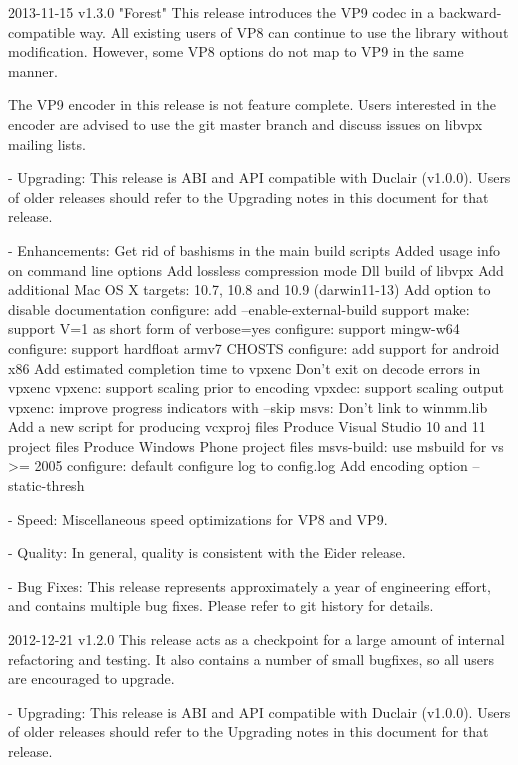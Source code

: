 
\begin{DoxyVerbInclude}
2013-11-15 v1.3.0 "Forest"
  This release introduces the VP9 codec in a backward-compatible way.
  All existing users of VP8 can continue to use the library without
  modification. However, some VP8 options do not map to VP9 in the same manner.

  The VP9 encoder in this release is not feature complete. Users interested in
  the encoder are advised to use the git master branch and discuss issues on
  libvpx mailing lists.

  - Upgrading:
    This release is ABI and API compatible with Duclair (v1.0.0). Users
    of older releases should refer to the Upgrading notes in this document
    for that release.

  - Enhancements:
      Get rid of bashisms in the main build scripts
      Added usage info on command line options
      Add lossless compression mode
      Dll build of libvpx
      Add additional Mac OS X targets: 10.7, 10.8 and 10.9 (darwin11-13)
      Add option to disable documentation
      configure: add --enable-external-build support
      make: support V=1 as short form of verbose=yes
      configure: support mingw-w64
      configure: support hardfloat armv7 CHOSTS
      configure: add support for android x86
      Add estimated completion time to vpxenc
      Don't exit on decode errors in vpxenc
      vpxenc: support scaling prior to encoding
      vpxdec: support scaling output
      vpxenc: improve progress indicators with --skip
      msvs: Don't link to winmm.lib
      Add a new script for producing vcxproj files
      Produce Visual Studio 10 and 11 project files
      Produce Windows Phone project files
      msvs-build: use msbuild for vs >= 2005
      configure: default configure log to config.log
      Add encoding option --static-thresh

  - Speed:
      Miscellaneous speed optimizations for VP8 and VP9.

  - Quality:
      In general, quality is consistent with the Eider release.

  - Bug Fixes:
      This release represents approximately a year of engineering effort,
      and contains multiple bug fixes. Please refer to git history for details.


2012-12-21 v1.2.0
  This release acts as a checkpoint for a large amount of internal refactoring
  and testing. It also contains a number of small bugfixes, so all users are
  encouraged to upgrade.

  - Upgrading:
    This release is ABI and API compatible with Duclair (v1.0.0). Users
    of older releases should refer to the Upgrading notes in this
    document for that release.


\end{DoxyVerbInclude}
